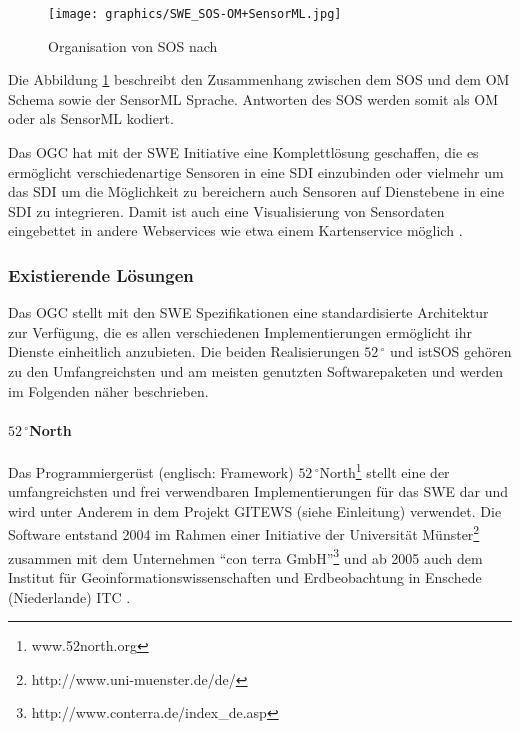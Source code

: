 \citep{botts_ogc_2008}\citep{woolf_gigas_2008}\citep{kunkel_teodoor:_2012}\citep{walkowski_sensor_2008}

\begin{figure}[H]
	\centering
 	 \texttt{[image: graphics/SWE\_SOS-OM+SensorML.jpg]} 
	\caption{Organisation von SOS nach \citep{ansorge_web_2012}}
	 \label{fig:swe_sos-om+sml}
\end{figure}

Die Abbildung \ref{fig:swe_sos-om+sml} beschreibt den Zusammenhang zwischen dem \gls{SOS} und dem \gls{OM} Schema sowie der \gls{SensorML} Sprache. Antworten des \gls{SOS} werden somit als \gls{OM} oder als \gls{SensorML} kodiert.

Das \gls{OGC} hat mit der \gls{SWE} Initiative eine Komplettlösung geschaffen, die es ermöglicht verschiedenartige Sensoren in eine  \gls{SDI} einzubinden oder vielmehr um das \gls{SDI} um die Möglichkeit zu bereichern auch Sensoren auf Dienstebene in eine \gls{SDI} zu integrieren. Damit ist auch eine Visualisierung von Sensordaten eingebettet in andere Webservices wie etwa einem Kartenservice möglich \citep{broring_new_2011}\citep{walkowski_sensor_2008}\citep{dollner_techniken_2007}.


\subsubsection{Existierende Lösungen}
Das \gls{OGC} stellt mit den \gls{SWE} Spezifikationen eine standardisierte Architektur zur Verfügung, die es allen verschiedenen Implementierungen ermöglicht ihr Dienste einheitlich anzubieten. Die beiden Realisierungen $52\,^{\circ}$ und istSOS gehören zu den Umfangreichsten und am meisten genutzten Softwarepaketen und werden im Folgenden näher beschrieben.


\paragraph{$52\,^{\circ}$North}
Das Programmiergerüst (englisch: Framework) $52\,^{\circ}$North\footnote{www.52north.org} stellt eine der umfangreichsten und frei verwendbaren Implementierungen für das \gls{SWE} dar und wird unter Anderem in dem Projekt \gls{GITEWS} (siehe Einleitung) verwendet. Die Software entstand 2004 im Rahmen einer Initiative der Universität Münster\footnote{http://www.uni-muenster.de/de/} zusammen mit dem Unternehmen ``con terra GmbH''\footnote{http://www.conterra.de/index\_de.asp} und ab 2005 auch dem Institut für Geoinformationswissenschaften und Erdbeobachtung in Enschede (Niederlande) \gls{ITC} \citep{botts_ogc_2008}\citep{kraak_what_2005}. 

